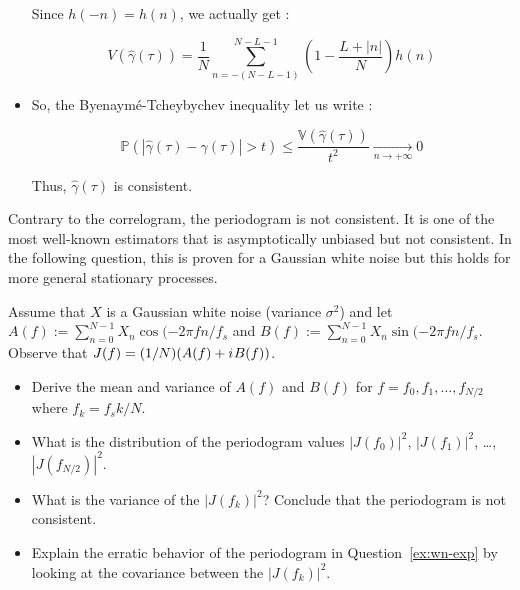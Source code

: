 \documentclass[11pt]{article}
\begin{document}
\begin{solution}
\begin{itemize}
        Since $h(-n)=h(n)$, we actually get :
    
        $$ V(\hat{\gamma}(\tau)) = \frac{1}{N}\sum_{n=-(N-L-1)}^{N-L-1}(1-\frac{L+|n|}{N})h(n)$$

        \item So, the Byenaymé-Tcheybychev inequality let us write : 

        $$\mathbb{P}(|\hat{\gamma}(\tau) - \gamma(\tau)| > t) \leq \dfrac{\mathbb{V}(\hat{\gamma}(\tau))}{t^2} \underset{n \rightarrow + \infty}{\rightarrow} 0$$
    
        Thus, $\hat{\gamma}(\tau)$ is consistent.
        
    \end{itemize}

\end{solution}

Contrary to the correlogram, the periodogram is not consistent.
It is one of the most well-known estimators that is asymptotically unbiased but not consistent.
In the following question, this is proven for a Gaussian white noise but this holds for more general stationary processes.
\begin{exercise}
    Assume that $X$ is a Gaussian white noise (variance $\sigma^2$) and let $A(f):=\sum_{n=0}^{N-1} X_n \cos(-2\pi f n/f_s$ and $B(f):=\sum_{n=0}^{N-1} X_n \sin(-2\pi f n/f_s$.
    Observe that $J(f) = (1/N) (A(f) + {i\mkern1mu} B(f))$.
    \begin{itemize}
        \item Derive the mean and variance of $A(f)$ and $B(f)$ for $f=f_0, f_1,\dots, f_{N/2}$ where $f_k=f_s k/N$.
        \item What is the distribution of the periodogram values $|J(f_0)|^2$, $|J(f_1)|^2$, \dots, $|J(f_{N/2})|^2$.
        \item What is the variance of the $|J(f_k)|^2$? Conclude that the periodogram is not consistent.
        \item Explain the erratic behavior of the periodogram in Question~\ref{ex:wn-exp} by looking at the covariance between the $|J(f_k)|^2$.
    \end{itemize}
    
\end{exercise}
\end{document}
